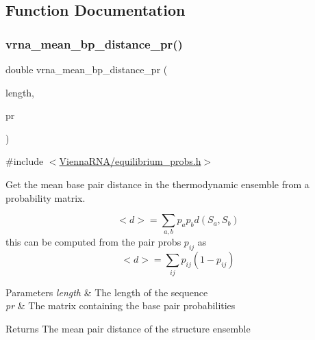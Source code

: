 \subsection{Function Documentation}
\mbox{\label{group__part__func__global_gad3f0c240512e6d43e2e4d4c2076021f5}} 
\subsubsection{\texorpdfstring{vrna\_mean\_bp\_distance\_pr()}{vrna\_mean\_bp\_distance\_pr()}}
{\footnotesize\ttfamily double vrna\+\_\+mean\+\_\+bp\+\_\+distance\+\_\+pr (\begin{DoxyParamCaption}\item[{int}]{length,  }\item[{\mbox{\hyperlink{group__data__structures_ga31125aeace516926bf7f251f759b6126}{F\+L\+T\+\_\+\+O\+R\+\_\+\+D\+BL}} $\ast$}]{pr }\end{DoxyParamCaption})}



{\ttfamily \#include $<$\mbox{\hyperlink{equilibrium__probs_8h}{Vienna\+R\+N\+A/equilibrium\+\_\+probs.\+h}}$>$}



Get the mean base pair distance in the thermodynamic ensemble from a probability matrix. 

\[ <d> = \sum_{a,b} p_a p_b d(S_a,S_b) \] this can be computed from the pair probs $ p_{ij} $ as \[ <d> = \sum_{ij} p_{ij}(1-p_{ij}) \]


\begin{DoxyParams}{Parameters}
{\em length} & The length of the sequence \\
\hline
{\em pr} & The matrix containing the base pair probabilities \\
\hline
\end{DoxyParams}
\begin{DoxyReturn}{Returns}
The mean pair distance of the structure ensemble 
\end{DoxyReturn}
\mbox{\label{group__part__func__global_gaa6b8983b559b9ef4b2e1b31113ea317b}} 
